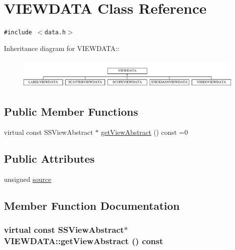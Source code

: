 \hypertarget{class_v_i_e_w_d_a_t_a}{
\section{VIEWDATA Class Reference}
\label{class_v_i_e_w_d_a_t_a}
}
{\tt \#include $<$data.h$>$}

Inheritance diagram for VIEWDATA::\begin{figure}[H]
\begin{center}
\leavevmode
\includegraphics[height=1.50336cm]{class_v_i_e_w_d_a_t_a}
\end{center}
\end{figure}
\subsection*{Public Member Functions}
\begin{CompactItemize}
\item 
virtual const SSViewAbstract $\ast$ \hyperlink{class_v_i_e_w_d_a_t_a_1b4cca271e32b8d47b615e75dbf0624e}{getViewAbstract} () const =0
\end{CompactItemize}
\subsection*{Public Attributes}
\begin{CompactItemize}
\item 
unsigned \hyperlink{class_v_i_e_w_d_a_t_a_ebcb455317fac9dd8048cc480aa41884}{source}
\end{CompactItemize}


\subsection{Member Function Documentation}
\hypertarget{class_v_i_e_w_d_a_t_a_1b4cca271e32b8d47b615e75dbf0624e}{
\subsubsection[{getViewAbstract}]{\setlength{\rightskip}{0pt plus 5cm}virtual const SSViewAbstract$\ast$ VIEWDATA::getViewAbstract () const}}
\label{class_v_i_e_w_d_a_t_a_1b4cca271e32b8d47b615e75dbf0624e}




